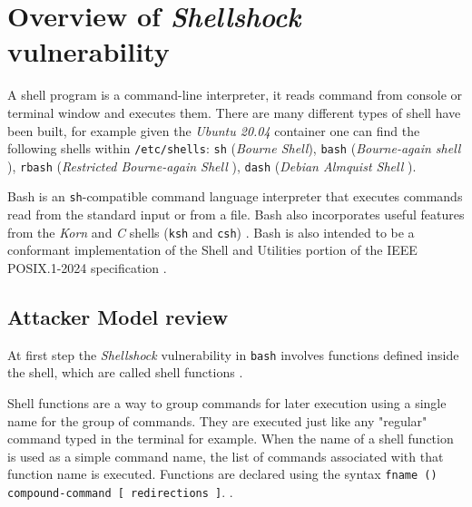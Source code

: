 \documentclass[12pt,a4paper,twocolumn]{article}
\begin{document}
\setcounter{page}{1}

 
\section{Overview of \textit{Shellshock} vulnerability}
\label{sec:shellshock.overview}
%


A shell program is a command-line interpreter, it reads command  from console or terminal window and executes them. \cite{seedlabshellshockattack} There are many different types of shell have been built, for example given the \textit{Ubuntu 20.04} container one can find the following shells within \lstinline{/etc/shells}: \lstinline{sh} (\textit{Bourne Shell}\cite{shell.sh}), \lstinline{bash} (\textit{Bourne-again shell} \cite{shell.bash}), \lstinline{rbash} (\textit{Restricted Bourne-again Shell} \cite{shell.rbash}), \lstinline{dash} (\textit{Debian Almquist Shell} \cite{shell.dash}).\cite{compseced3}

Bash is an \lstinline{sh}-compatible command language interpreter that executes commands  read from the standard input or from a file.  Bash also incorporates useful features from the \textit{Korn} and \textit{C} shells (\lstinline{ksh} and \lstinline{csh}) \cite{shell.csh, shell.ksh}. Bash is also intended to be a conformant implementation  of  the  Shell  and Utilities  portion  of  the  IEEE  POSIX.1-2024 specification \cite{shell.bash,posix1.2024}.

\subsection{Attacker Model review}
\label{ssec:shellshock.attacker.model}

At first step the \textit{Shellshock} vulnerability in \lstinline{bash} involves functions defined inside the shell, which are called shell functions \cite{seedlabshellshockattack, shell.functions}. 

Shell functions are a way to group commands for later execution using a single name for the group of commands. They are executed just like any "regular" command typed in the terminal for example. When the name of a shell function is used as a simple command name, the list of commands associated with that function name is executed.  Functions are declared using the syntax \lstinline{fname () compound-command [ redirections ]}. \cite{shell.functions}. \cite{compseced3}
\end{document}
